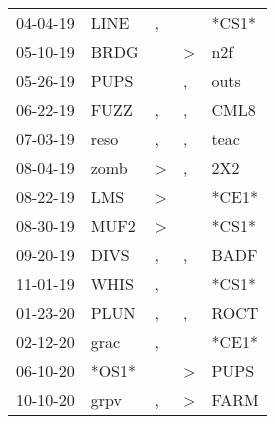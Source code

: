 \begin{supertabular}{p{0.07\textwidth}p{0.06\textwidth}p{0.02\textwidth}p{0.02\textwidth}p{0.06\textwidth}}
          04-04-19\textsuperscript{} &           LINE\textsuperscript{} &                , &                  &                            *CS1* \\
          05-10-19\textsuperscript{} &           BRDG\textsuperscript{} &                  &     \textgreater &            n2f\textsuperscript{} \\
          05-26-19\textsuperscript{} &           PUPS\textsuperscript{} &                  &                , &           outs\textsuperscript{} \\
          06-22-19\textsuperscript{} &           FUZZ\textsuperscript{} &                , &                , &           CML8\textsuperscript{} \\
          07-03-19\textsuperscript{} &           reso\textsuperscript{} &                , &                , &           teac\textsuperscript{} \\
          08-04-19\textsuperscript{} &           zomb\textsuperscript{} &     \textgreater &                , &            2X2\textsuperscript{} \\
          08-22-19\textsuperscript{} &            LMS\textsuperscript{} &     \textgreater &                  &                            *CE1* \\
          08-30-19\textsuperscript{} &           MUF2\textsuperscript{} &     \textgreater &                  &                            *CS1* \\
          09-20-19\textsuperscript{} &           DIVS\textsuperscript{} &                , &                , &           BADF\textsuperscript{} \\
          11-01-19\textsuperscript{} &           WHIS\textsuperscript{} &                , &                  &                            *CS1* \\
          01-23-20\textsuperscript{} &           PLUN\textsuperscript{} &                , &                , &           ROCT\textsuperscript{} \\
          02-12-20\textsuperscript{} &           grac\textsuperscript{} &                , &                  &                            *CE1* \\
          06-10-20\textsuperscript{} &                            *OS1* &                  &     \textgreater &           PUPS\textsuperscript{} \\
          10-10-20\textsuperscript{} &           grpv\textsuperscript{} &                , &     \textgreater &           FARM\textsuperscript{} \\
\end{supertabular}
